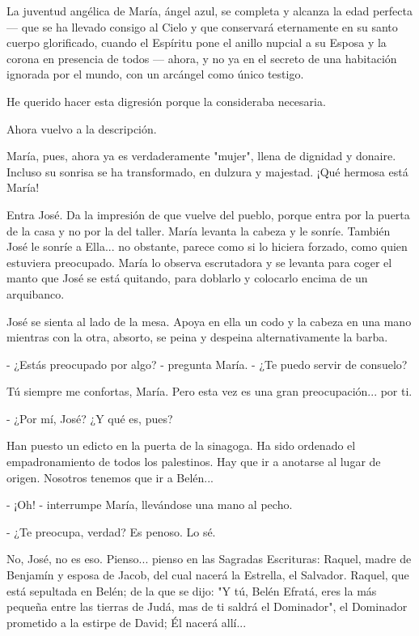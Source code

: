 \documentclass[12pt]{book} %
\begin{document}
La juventud angélica de María, ángel azul, se completa y alcanza la edad perfecta — que se ha llevado consigo al Cielo y que conservará eternamente en su santo cuerpo glorificado, cuando el Espíritu pone el anillo nupcial a su Esposa y la corona en presencia de todos — ahora, y no ya en el secreto de una habitación ignorada por el mundo, con un arcángel como único testigo. 

He querido hacer esta digresión porque la consideraba necesaria. 

Ahora vuelvo a la descripción. 

María, pues, ahora ya es verdaderamente "mujer", llena de dignidad y donaire. Incluso su sonrisa se ha transformado, en dulzura y majestad. ¡Qué hermosa está María! 

Entra José. Da la impresión de que vuelve del pueblo, porque entra por la puerta de la casa y no por la del taller. María levanta la cabeza y le sonríe. También José le sonríe a Ella... no obstante, parece como si lo hiciera forzado, como quien estuviera preocupado. María lo observa escrutadora y se levanta para coger el manto que José se está quitando, para doblarlo y colocarlo encima de un arquibanco. 

José se sienta al lado de la mesa. Apoya en ella un codo y la cabeza en una mano mientras con la otra, absorto, se peina y despeina alternativamente la barba. 

- ¿Estás preocupado por algo? - pregunta María. - ¿Te puedo servir de consuelo? 

Tú siempre me confortas, María. Pero esta vez es una gran preocupación... por ti. 

- ¿Por mí, José? ¿Y qué es, pues? 

Han puesto un edicto en la puerta de la sinagoga. Ha sido ordenado el empadronamiento de todos los palestinos. Hay que ir a anotarse al lugar de origen. Nosotros tenemos que ir a Belén... 

- ¡Oh! - interrumpe María, llevándose una mano al pecho. 

- ¿Te preocupa, verdad? Es penoso. Lo sé. 

No, José, no es eso. Pienso... pienso en las Sagradas Escrituras: Raquel, madre de Benjamín y esposa de Jacob, del cual nacerá la Estrella, el Salvador. Raquel, que está sepultada en Belén; de la que se dijo: "Y tú, Belén Efratá, eres la más pequeña entre las tierras de Judá, mas de ti saldrá el Dominador", el Dominador prometido a la estirpe de David; Él nacerá allí... 
\end{document}
